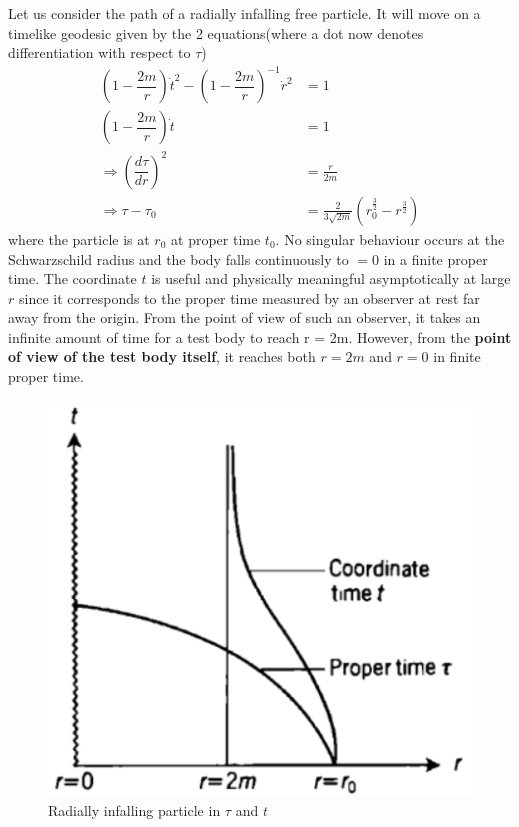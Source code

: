 \documentclass[12pt,a4paper]{article}
\numberwithin{table}{section}
\numberwithin{figure}{section}
\numberwithin{equation}{section}
\theoremstyle{remark}
\theoremstyle{definition}
\begin{document}
Let us consider the path of a radially infalling free particle. It will move on a timelike geodesic given by the 2 equations(where a dot now denotes differentiation with respect to $\tau$)
\begin{align*}
\left(1-\dfrac{2m}{r}\right)\dot{t}^2-\left(1-\dfrac{2m}{r}\right)^{-1}\dot{r}^2&=1\\
\left(1-\dfrac{2m}{r}\right)\dot{t}&=1\\
\Rightarrow \left(\dfrac{d\tau}{dr} \right)^2&=\frac{r}{2m}\\
\Rightarrow \tau-\tau_0&=\frac{2}{3\sqrt{2m}}(r^{\frac{3}{2}}_0-r^{\frac{3}{2}})
\end{align*}
where the particle is at $r_0$ at proper time $t_0$. No singular behaviour 
occurs at the Schwarzschild radius and the body falls continuously to $ =0$ in a finite proper time. The coordinate $t$ is useful and physically meaningful asymptotically at large $r$ since it corresponds to the proper time measured by an observer at rest far away from the origin. From the point of view of such an observer, it takes an infinite amount of time for a test body to reach r = 2m. However, from the \textbf{point of view of the test body itself}, it reaches both $r=2m$ and $r=0$ in finite proper time. 
\begin{figure}[H]
    \centering
  \includegraphics[scale=0.6]{st2}
  \caption{Radially infalling particle in  $\tau$ and $t$}
  \label{fig:deviation}
\end{figure}
\end{document}
